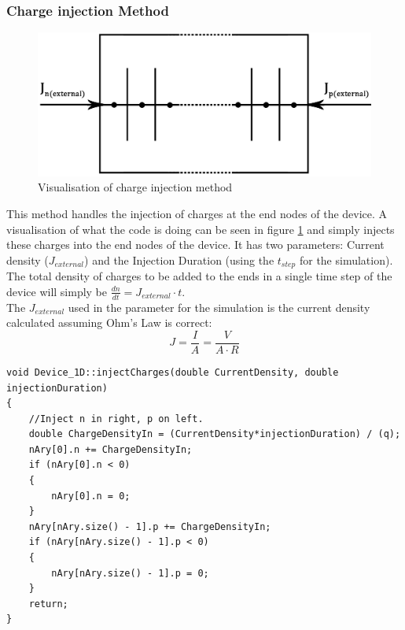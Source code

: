 \documentclass[titlepage]{article}
\begin{document}
\subsubsection{Charge injection Method}
\begin{figure}[H]
	\centering
	\includegraphics[scale=0.17]{Figures/Injection}
	\caption{\label{fig:Code:Injection} Visualisation of charge injection method}
\end{figure}
This method handles the injection of charges at the end nodes of the device. A visualisation of what the code is doing can be seen in figure \ref{fig:Code:Injection} and simply injects these charges into the end nodes of the device.
It has two parameters: Current density ($J_{external}$) and the Injection Duration (using the $t_{step}$ for the simulation). The total density of charges to be added to the ends in a single time step of the device will simply be $\frac{dn}{dt} = J_{external}\cdot t$.\\
The $J_{external}$ used in the parameter for the simulation is the current density calculated assuming Ohm's Law is correct:
\begin{equation}
	J = \frac{I}{A} = \frac{V}{A\cdot R}
\end{equation}
\begin{lstlisting}[caption = Charge injection method, basicstyle=\tiny]
void Device_1D::injectCharges(double CurrentDensity, double injectionDuration)
{
	//Inject n in right, p on left.
	double ChargeDensityIn = (CurrentDensity*injectionDuration) / (q);
	nAry[0].n += ChargeDensityIn;
	if (nAry[0].n < 0)
	{
		nAry[0].n = 0;
	}
	nAry[nAry.size() - 1].p += ChargeDensityIn;
	if (nAry[nAry.size() - 1].p < 0)
	{
		nAry[nAry.size() - 1].p = 0;
	}
	return;
}
\end{lstlisting}
\end{document}
